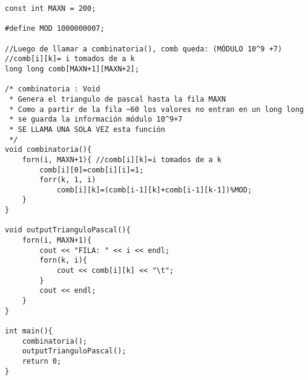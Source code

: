 \begin{verbatim}
const int MAXN = 200;

#define MOD 1000000007;

//Luego de llamar a combinatoria(), comb queda: (MÓDULO 10^9 +7)
//comb[i][k]= i tomados de a k
long long comb[MAXN+1][MAXN+2];

/* combinatoria : Void
 * Genera el triangulo de pascal hasta la fila MAXN
 * Como a partir de la fila ~60 los valores no entran en un long long
 * se guarda la información módulo 10^9+7
 * SE LLAMA UNA SOLA VEZ esta función
 */
void combinatoria(){
	forn(i, MAXN+1){ //comb[i][k]=i tomados de a k
		comb[i][0]=comb[i][i]=1;
		forr(k, 1, i) 
			comb[i][k]=(comb[i-1][k]+comb[i-1][k-1])%MOD;
	}
}

void outputTrianguloPascal(){
	forn(i, MAXN+1){
		cout << "FILA: " << i << endl;
		forn(k, i){
			cout << comb[i][k] << "\t";
		}
		cout << endl;
	}
}

int main(){
	combinatoria();
	outputTrianguloPascal();
	return 0;
}
\end{verbatim}

